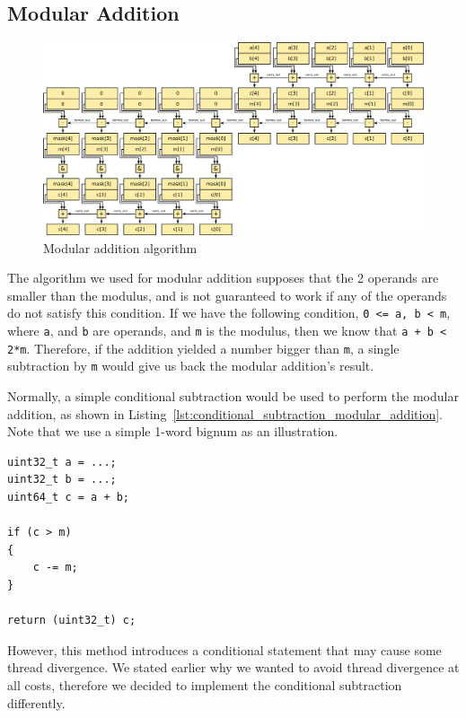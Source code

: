 \documentclass[12pt, a4paper]{report}
\begin{document}
\begin{sloppypar}
\subsection{Modular Addition}
\begin{figure}[h]
\centering
\includegraphics[width=\linewidth]{figs/modular_addition}
\caption{Modular addition algorithm}
\label{fig:modular_addition}
\end{figure}

The algorithm we used for modular addition supposes that the 2 operands are
smaller than the modulus, and is not guaranteed to work if any of the operands
do not satisfy this condition.
If we have the following condition, \verb+0 <= a, b < m+, where \verb+a+,
and \verb+b+ are operands, and \verb+m+ is the modulus, then we know that
\verb!a + b < 2*m!.
Therefore, if the addition yielded a number bigger than \verb+m+, a single
subtraction by \verb+m+ would give us back the modular addition's result.

Normally, a simple conditional subtraction would be used to perform the modular
addition, as shown in
Listing~\ref{lst:conditional_subtraction_modular_addition}.
Note that we use a simple 1-word bignum as an illustration.

\begin{lstlisting}
uint32_t a = ...;
uint32_t b = ...;
uint64_t c = a + b;

if (c > m)
{
    c -= m;
}

return (uint32_t) c;
\end{lstlisting}

However, this method introduces a conditional statement that may cause some
thread divergence.
We stated earlier why we wanted to avoid thread divergence at all costs,
therefore we decided to implement the conditional subtraction differently.


\end{sloppypar}
\end{document}
